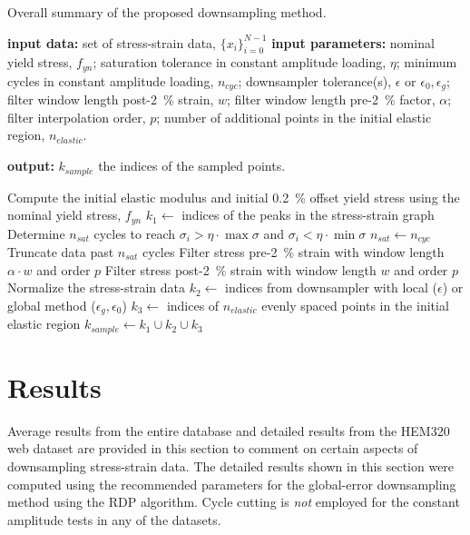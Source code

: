 \documentclass[a4paper,11pt]{article}
\begin{document}
\begin{algorithm}
	\caption{Overall summary of the proposed downsampling method.}
	\label{alg:overall-summary}
	\begin{algorithmic}[1]
        \State \textbf{input data:} set of stress-strain data, $\{x_i\}_{i=0}^{N-1}$
        \State \textbf{input parameters:} nominal yield stress, $f_{yn}$; saturation tolerance in constant amplitude loading, $\eta$; minimum cycles in constant amplitude loading, $n_{cyc}$; downsampler tolerance(s), $\epsilon$ or $\epsilon_0, \epsilon_g$; filter window length post-2~\% strain, $w$; filter window length pre-2~\% factor, $\alpha$; filter interpolation order, $p$; number of additional points in the initial elastic region, $n_{elastic}$.

        \State \textbf{output:} $k_{sample}$ the indices of the sampled points.
        \bigskip

        \State Compute the initial elastic modulus and initial 0.2~\% offset yield stress using the nominal yield stress, $f_{yn}$
        \State $k_{1} \gets $ indices of the peaks in the stress-strain graph
            \State Determine $n_{sat}$ cycles to reach $\sigma_i > \eta \cdot \max \sigma$ and $\sigma_i < \eta \cdot \min \sigma$
                \State $n_{sat} \gets n_{cyc}$
            \EndIf
            \State Truncate data past $n_{sat}$ cycles
        \EndIf
            \State Filter stress pre-2~\% strain with window length $\alpha \cdot w$ and order $p$
            \State Filter stress post-2~\% strain with window length $w$ and order $p$
        \EndIf
        \State Normalize the stress-strain data
        \State $k_2 \gets$ indices from downsampler with local ($\epsilon$) or global method ($\epsilon_g, \epsilon_0$) \label{algline:downsampler}
        \State $k_3 \gets$ indices of $n_{elastic}$ evenly spaced points in the initial elastic region
        \State $k_{sample} \gets k_1 \cup k_2 \cup k_3$
    \end{algorithmic}
\end{algorithm}



\section{Results}

Average results from the entire database and detailed results from the HEM320 web dataset are provided in this section to comment on certain aspects of downsampling stress-strain data.
The detailed results shown in this section were computed using the recommended parameters for the global-error downsampling method using the RDP algorithm.
Cycle cutting is \emph{not} employed for the constant amplitude tests in any of the datasets.
\end{document}
